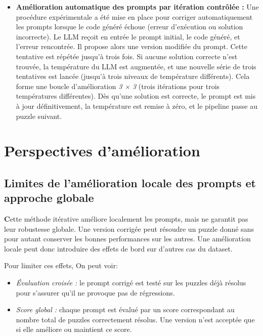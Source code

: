 \documentclass[a4paper,11pt]{article}
\begin{document}
\begin{itemize}
    \item \textbf{Amélioration automatique des prompts par itération contrôlée :}  
    Une procédure expérimentale a été mise en place pour corriger automatiquement les prompts lorsque le code généré échoue (erreur d’exécution ou solution incorrecte). Le LLM reçoit en entrée le prompt initial, le code généré, et l’erreur rencontrée. Il propose alors une version modifiée du prompt. Cette tentative est répétée jusqu’à trois fois. Si aucune solution correcte n’est trouvée, la température du LLM est augmentée, et une nouvelle série de trois tentatives est lancée (jusqu'à trois niveaux de température différents). Cela forme une boucle d'amélioration \emph{3 × 3} (trois itérations pour trois températures différentes). Dès qu’une solution est correcte, le prompt est mis à jour définitivement, la température est remise à zéro, et le pipeline passe au puzzle suivant.

\end{itemize}

\section{Perspectives d’amélioration}

\subsection{{Limites de l’amélioration locale des prompts et approche globale}}
        \textbf Cette méthode itérative améliore localement les prompts, mais ne garantit pas leur robustesse globale. Une version corrigée peut résoudre un puzzle donné sans pour autant conserver les bonnes performances sur les autres. Une amélioration locale peut donc introduire des effets de bord sur d’autres cas du dataset.

    Pour limiter ces effets, On peut voir:
        \begin{itemize}
        \item \textit{Évaluation croisée :} le prompt corrigé est testé sur les puzzles déjà résolus pour s’assurer qu’il ne provoque pas de régressions.\\

        \item \textit{Score global :} chaque prompt est évalué par un score correspondant au nombre total de puzzles correctement résolus. Une version n’est acceptée que si elle améliore ou maintient ce score.\\

    \end{itemize}
\end{document}
